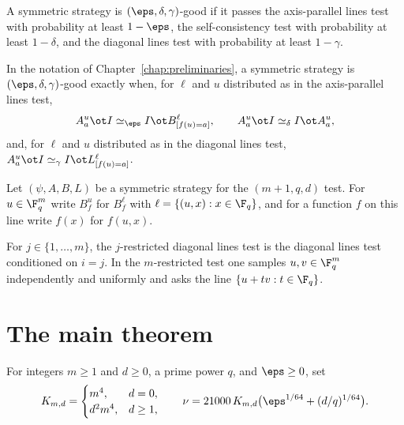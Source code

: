 \begin{definition}\label{def:good-strategy}
	\leanok
	A symmetric strategy is $(\eps,\delta,\gamma)$-good if it passes the
	axis-parallel lines test with probability at least $1-\eps$, the
	self-consistency test with probability at least $1-\delta$, and the
	diagonal lines test with probability at least $1-\gamma$.
\end{definition}

\begin{remark}\label{rem:good-strat-characterization}
	In the notation of Chapter~\ref{chap:preliminaries}, a symmetric strategy
	is $(\eps,\delta,\gamma)$-good exactly when, for $\ell$ and $u$ distributed
	as in the axis-parallel lines test,
	\[
		A^u_a\ot I\simeq_\eps I\ot B^\ell_{[f(u)=a]},
		\qquad
		A^u_a\ot I\simeq_\delta I\ot A^u_a,
	\]
	and, for $\ell$ and $u$ distributed as in the diagonal lines test,
	$A^u_a\ot I\simeq_\gamma I\ot L^\ell_{[f(u)=a]}$.
\end{remark}

\begin{definition}\label{not:conditioned-on-last-direction}
	Let $(\psi,A,B,L)$ be a symmetric strategy for the $(m+1,q,d)$ test.  For
	$u\in\F_q^m$ write $B^u_f$ for $B^\ell_f$ with
	$\ell=\{(u,x):x\in\F_q\}$, and for a function $f$ on this line write $f(x)$
	for $f(u,x)$.
\end{definition}

\begin{definition}\label{def:restricted-diagonal-lines-test}
	\leanok
	For $j\in\{1,\ldots,m\}$, the $j$-restricted diagonal lines test is the
	diagonal lines test conditioned on $i=j$.  In the $m$-restricted test one
	samples $u,v\in\F_q^m$ independently and uniformly and asks the line
	$\{u+tv:t\in\F_q\}$.
\end{definition}

\section{The main theorem}

\begin{definition}\label{def:main-formal-error}
	\leanok
	For integers $m\ge1$ and $d\ge0$, a prime power $q$, and $\eps\ge0$, set
	\[
		K_{m,d}=\begin{cases}m^4,&d=0,\\d^2m^4,&d\ge1,\end{cases}
		\qquad
		\nu=21000\,K_{m,d}\bigl(\eps^{1/64}+(d/q)^{1/64}\bigr).
	\]
\end{definition}

